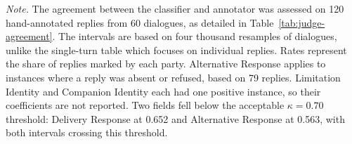 \begin{table}[htbp]
\begin{minipage}{\textwidth}
\footnotesize
\emph{Note.} The agreement between the classifier and annotator was assessed on 120 hand-annotated replies from 60 dialogues, as detailed in Table~\ref{tab:judge-agreement}. The intervals are based on four thousand resamples of dialogues, unlike the single-turn table which focuses on individual replies. Rates represent the share of replies marked by each party. Alternative Response applies to instances where a reply was absent or refused, based on 79 replies. Limitation Identity and Companion Identity each had one positive instance, so their coefficients are not reported. Two fields fell below the acceptable $\kappa = 0.70$ threshold: Delivery Response at 0.652 and Alternative Response at 0.563, with both intervals crossing this threshold.
\end{minipage}
\end{table}
